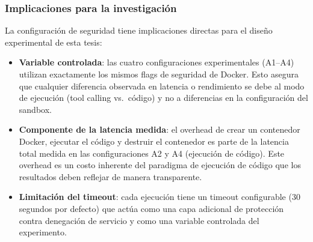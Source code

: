 \subsubsection{Implicaciones para la investigación}

La configuración de seguridad tiene implicaciones directas para el diseño
experimental de esta tesis:

\begin{itemize}
    \item \textbf{Variable controlada}: las cuatro configuraciones
    experimentales (A1--A4) utilizan exactamente los mismos flags de seguridad
    de Docker. Esto asegura que cualquier diferencia observada en latencia o
    rendimiento se debe al modo de ejecución (tool calling vs.\ código) y no a
    diferencias en la configuración del sandbox.

    \item \textbf{Componente de la latencia medida}: el overhead de crear un
    contenedor Docker, ejecutar el código y destruir el contenedor es parte de
    la latencia total medida en las configuraciones A2 y A4 (ejecución de
    código). Este overhead es un costo inherente del paradigma de ejecución de
    código que los resultados deben reflejar de manera transparente.

    \item \textbf{Limitación del timeout}: cada ejecución tiene un timeout
    configurable (30 segundos por defecto) que actúa como una capa adicional
    de protección contra denegación de servicio y como una variable controlada
    del experimento.
\end{itemize}

